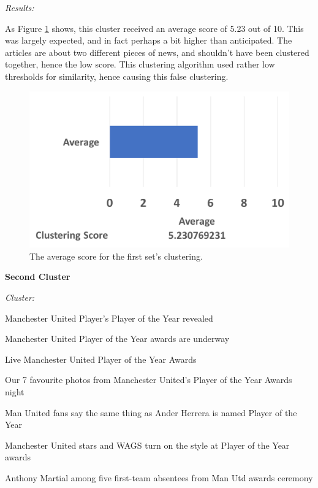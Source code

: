 \documentclass[12pt]{article}
\begin{document}
\emph{Results:}

As Figure \ref{cluster1} shows, this cluster received an average score of 5.23 out of 10. This was largely expected, and in fact perhaps a bit higher than anticipated. The articles are about two different pieces of news, and shouldn't have been clustered together, hence the low score. This clustering algorithm used rather low thresholds for similarity, hence causing this false clustering.  \\

\begin{figure}[ht!]
  \centering
    \includegraphics[scale=0.6]{cluster1score.png}
   \caption[The average score for a cluster]{The average score for the first set's clustering.}
   \label{cluster1}
\end{figure} 

\textbf{Second Cluster}

\begin{mdframed}

\emph{Cluster:}

Manchester United Player's Player of the Year revealed

Manchester United Player of the Year awards are underway

Live Manchester United Player of the Year Awards

Our 7 favourite photos from Manchester United's Player of the Year Awards night

Man United fans say the same thing as Ander Herrera is named Player of the Year

Manchester United stars and WAGS turn on the style at Player of the Year awards

Anthony Martial among five first-team absentees from Man Utd awards ceremony \\

\end{mdframed}
\end{document}
